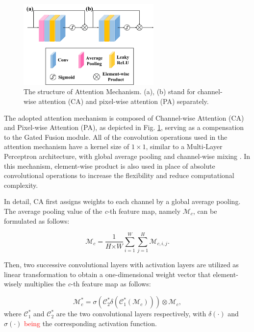 \documentclass[lettersize,journal]{IEEEtran}
\begin{document}
\begin{figure}[H]
    \centering
    \includegraphics[width=7cm]{figure2.png}
    \caption{The structure of Attention Mechanism. (a), (b) stand for channel-wise attention (CA) and pixel-wise attention (PA) separately. }
    \label{attention}
\end{figure}

The adopted attention mechanism is composed of Channel-wise Attention (CA) and Pixel-wise Attention (PA), as depicted in Fig. \ref{attention}, serving as a compensation to the Gated Fusion module. All of the convolution operations used in the attention mechanism have a kernel size of $1 \times 1$, similar to a Multi-Layer Perceptron architecture, with global average pooling and channel-wise mixing \cite{NEURIPS2021_mlp}. In this mechanism, element-wise product is also used in place of absolute convolutional operations to increase the flexibility and reduce computational complexity.

In detail, CA first assigns weights to each channel by a global average pooling. The average pooling value of the \textit{c}-th feature map, namely $\mathcal{M}_{c}$, can be formulated as follows:

\begin{equation}
    \mathcal{M}_{c} = \frac{1}{\textit{H} \times \textit{W}} \sum_{i=1}^\textit{W} \sum_{j=1}^\textit{H} \mathcal{M}_{c,i,j}.
\end{equation}

Then, two successive convolutional layers with activation layers are utilized as linear transformation to obtain a one-dimensional weight vector that element-wisely multiplies the \textit{c}-th feature map as follows:

\begin{equation}
    \mathcal{M}_c^* = \sigma(\mathcal{C}_2^* \delta (\mathcal{C}_1^*(\mathcal{M}_c))) \otimes \mathcal{M}_c,
\end{equation}
where $\mathcal{C}_1^*$ and $\mathcal{C}_2^*$ are the two convolutional layers respectively, with $\delta(\cdot)$ and $\sigma(\cdot)$ \textcolor{red}{being} the corresponding activation function. 
\end{document}
